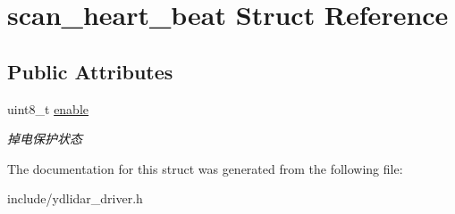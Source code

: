 \hypertarget{structscan__heart__beat}{}\section{scan\+\_\+heart\+\_\+beat Struct Reference}
\label{structscan__heart__beat}
\subsection*{Public Attributes}
\begin{DoxyCompactItemize}
\item 
uint8\+\_\+t \hyperlink{structscan__heart__beat_a2b75f0058448601c590dda44d962d5c9}{enable}\hypertarget{structscan__heart__beat_a2b75f0058448601c590dda44d962d5c9}{}\label{structscan__heart__beat_a2b75f0058448601c590dda44d962d5c9}

\begin{DoxyCompactList}\small\item\em 掉电保护状态 \end{DoxyCompactList}\end{DoxyCompactItemize}


The documentation for this struct was generated from the following file\+:\begin{DoxyCompactItemize}
\item 
include/ydlidar\+\_\+driver.\+h\end{DoxyCompactItemize}
